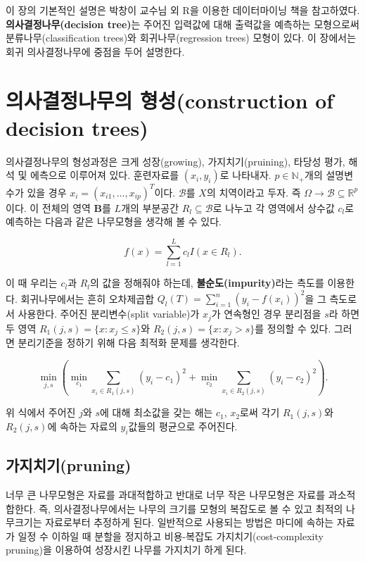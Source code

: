 \documentclass[b5paper,]{scrbook}
\theoremstyle{plain}
\theoremstyle{definition}
\numberwithin{equation}{section}
\begin{document}
이 장의 기본적인 설명은 박창이 교수님 외 R을 이용한 데이터마이닝 책을
참고하였다. \textbf{의사결정나무(decision tree)}는 주어진 입력값에 대해
출력값을 예측하는 모형으로써 분류나무(classification trees)와
회귀나무(regression trees) 모형이 있다. 이 장에서는 회귀 의사결정나무에
중점을 두어 설명한다.

\section{의사결정나무의 형성(construction of decision
trees)}\label{-construction-of-decision-trees}

의사결정나무의 형성과정은 크게 성장(growing), 가지치기(pruining), 타당성
평가, 해석 및 에측으로 이루어져 있다. 훈련자료를 \((x_{i}, y_{i})\)로
나타내자. \(p \in \mathbb{N}_{+}\)개의 설명변수가 있을 경우
\(x_{i}=(x_{i1}, \ldots, x_{ip})^{T}\)이다. \(\mathcal{B}\)를 \(X\)의
치역이라고 두자. 즉
\(\Omega \rightarrow \mathcal{B} \subseteq \mathbb{R}^{p}\)이다. 이
전체의 영역 \(\mathbf{B}\)를 \(L\)개의 부분공간
\(R_{l}\subseteq \mathcal{B}\)로 나누고 각 영역에서 상수값 \(c_{l}\)로
예측하는 다음과 같은 나무모형을 생각해 볼 수 있다.

\[f(x)=\sum_{l=1}^{L}c_{l}I(x\in R_{l}).\]

이 때 우리는 \(c_{l}\)과 \(R_{l}\)의 값을 정해줘야 하는데,
\textbf{불순도(impurity)}라는 측도를 이용한다. 회귀나무에서는 흔히
오차제곱합 \(Q_{l}(T)=\sum_{i=1}^{n}(y_{i}-f(x_{i}))^{2}\)을 그 측도로서
사용한다. 주어진 분리변수(split variable)가 \(x_{j}\)가 연속형인 경우
분리점을 \(s\)라 하면 두 영역 \(R_{1}(j,s)=\{ x: x_{j} \leq s\}\)와
\(R_{2}(j,s)=\{ x: x_{j} > s\}\)를 정의할 수 있다. 그러면 분리기준을
정하기 위해 다음 최적화 문제를 생각한다.

\[\min_{j,s}(\min_{c_{1}}\sum_{x_{i}\in R_{1}(j,s)}(y_{i}-c_{1})^{2} + \min_{c_{2}}\sum_{x_{i}\in R_{2}(j,s)}(y_{i}-c_{2})^{2}).\]

위 식에서 주어진 \(j\)와 \(s\)에 대해 최소값을 갖는 해는 \(c_{1}\),
\(x_{2}\)로써 각기 \(R_{1}(j,s)\)와 \(R_{2}(j,s)\)에 속하는 자료의
\(y_{i}\)값들의 평균으로 주어진다.

\subsection{가지치기(pruning)}\label{pruning}

너무 큰 나무모형은 자료를 과대적합하고 반대로 너무 작은 나무모형은
자료를 과소적합한다. 즉, 의사결정나무에서는 나무의 크기를 모형의
복잡도로 볼 수 있고 최적의 나무크기는 자료로부터 추정하게 된다.
일반적으로 사용되는 방법은 마디에 속하는 자료가 일정 수 이하일 때 분할을
정지하고 비용-복잡도 가지치기(cost-complexity pruning)을 이용하여
성장시킨 나무를 가지치기 하게 된다.
\end{document}
